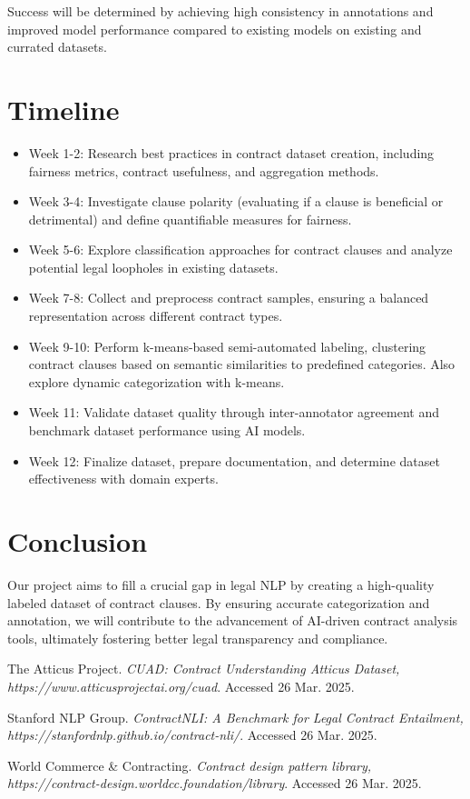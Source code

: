 \documentclass[11pt, oneside]{article}   	%
\begin{document}
Success will be determined by achieving high consistency in annotations and improved model performance compared to existing models on existing and currated datasets.

\section*{Timeline}
\begin{itemize}
	\item Week 1-2: Research best practices in contract dataset creation, including fairness metrics, contract usefulness, and aggregation methods.
	\item Week 3-4: Investigate clause polarity (evaluating if a clause is beneficial or detrimental) and define quantifiable measures for fairness.
	\item Week 5-6: Explore classification approaches for contract clauses and analyze potential legal loopholes in existing datasets.
	\item Week 7-8: Collect and preprocess contract samples, ensuring a balanced representation across different contract types.
	\item Week 9-10: Perform k-means-based semi-automated labeling, clustering contract clauses based on semantic similarities to predefined categories. Also explore dynamic categorization with k-means.
	\item Week 11: Validate dataset quality through inter-annotator agreement and benchmark dataset performance using AI models.
	\item Week 12: Finalize dataset, prepare documentation, and determine dataset effectiveness with domain experts.
\end{itemize}
\section*{Conclusion}
Our project aims to fill a crucial gap in legal NLP by creating a high-quality labeled dataset of contract clauses. By ensuring accurate categorization and annotation, we will contribute to the advancement of AI-driven contract analysis tools, ultimately fostering better legal transparency and compliance.

\begin{thebibliography}{9}

	The Atticus Project.
	\textit{CUAD: Contract Understanding Atticus Dataset, https://www.atticusprojectai.org/cuad}.
	Accessed 26 Mar. 2025.
	
	Stanford NLP Group.
	\textit{ContractNLI: A Benchmark for Legal Contract Entailment, https://stanfordnlp.github.io/contract-nli/}.
	Accessed 26 Mar. 2025.

	World Commerce \& Contracting.
	\textit{Contract design pattern library, https://contract-design.worldcc.foundation/library}.
    Accessed 26 Mar. 2025.

	\end{thebibliography}
\end{document}
